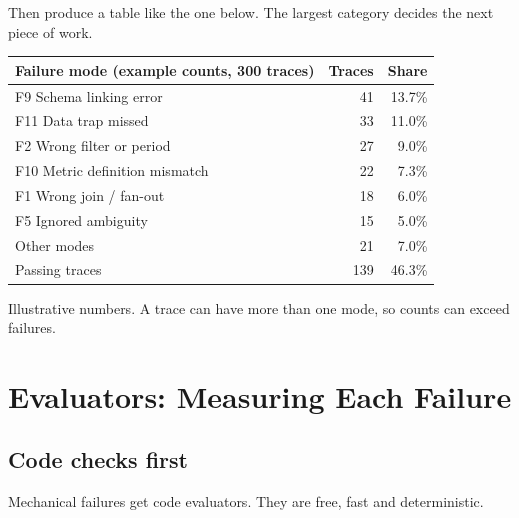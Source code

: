 \documentclass[11pt,a4paper]{article}
\begin{document}
Then produce a table like the one below. The largest category decides the next piece of work.

\begin{center}
\small
\begin{tabular}{@{}l r r@{}}
\toprule
\textbf{Failure mode (example counts, 300 traces)} & \textbf{Traces} & \textbf{Share}\\
\midrule
F9 Schema linking error & 41 & 13.7\%\\
F11 Data trap missed & 33 & 11.0\%\\
F2 Wrong filter or period & 27 & 9.0\%\\
F10 Metric definition mismatch & 22 & 7.3\%\\
F1 Wrong join / fan-out & 18 & 6.0\%\\
F5 Ignored ambiguity & 15 & 5.0\%\\
Other modes & 21 & 7.0\%\\
\midrule
Passing traces & 139 & 46.3\%\\
\bottomrule
\end{tabular}

{\footnotesize\color{grey} Illustrative numbers. A trace can have more than one mode, so counts
can exceed failures.}
\end{center}

\section{Evaluators: Measuring Each Failure}

\subsection{Code checks first}

Mechanical failures get code evaluators. They are free, fast and deterministic.
\end{document}
